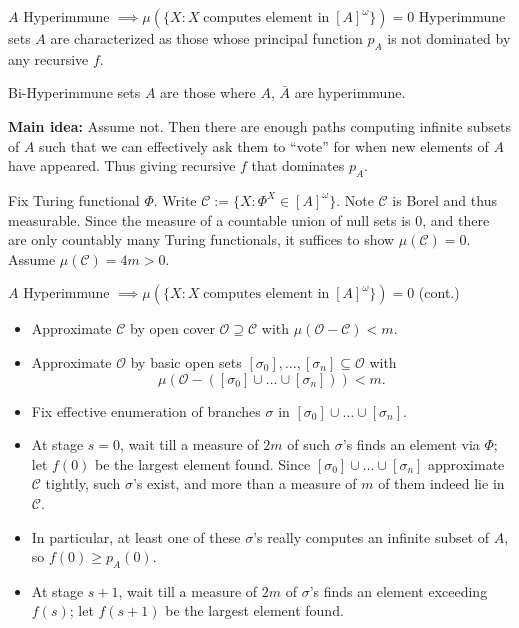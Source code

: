 \begin{frame}{$A$ Hyperimmune $\implies \mu(\{X: X\; \text{computes
element in}\; [A]^\omega\}) =0$}
  Hyperimmune sets $A$ are characterized as those whose principal
  function $p_A$ is not dominated by any recursive $f$. \\
  \vspace{1em}

  Bi-Hyperimmune sets $A$ are those where $A$, $\bar{A}$ are hyperimmune.\\
  \vspace{1em}

  \textbf{Main idea:} Assume not. Then there are enough paths computing
  infinite subsets of $A$ such that we can effectively ask them to ``vote''
  for when new elements of $A$ have appeared. Thus giving recursive
  $f$ that dominates $p_A$.\\
  \vspace{1em}

  Fix Turing functional $\Phi$. Write $\mathcal{C} :=\{X:
  \Phi^X\in[A]^\omega\}$. Note $\mathcal{C}$ is Borel and thus measurable.
  Since the measure of a countable union of null sets is 0, and
  there are only countably many Turing functionals, it suffices to show
  $\mu(\mathcal{C})=0$. Assume $\mu(\mathcal{C})=4m>0$.
\end{frame}

\begin{frame}{$A$ Hyperimmune $\implies \mu(\{X: X\; \text{computes
element in}\; [A]^\omega\}) =0$ (cont.)}
  \begin{itemize}
    \item Approximate $\mathcal{C}$ by open cover
      $\mathcal{O}\supseteq\mathcal{C}$ with
      $\mu(\mathcal{O}-\mathcal{C})<m$.
    \item Approximate $\mathcal{O}$ by basic open sets
      $[\sigma_0],\ldots,[\sigma_n] \subseteq\mathcal{O}$ with
      \[\mu(\mathcal{O}-([\sigma_0]\cup\ldots\cup[\sigma_n])) <m.\]
    \item Fix effective enumeration of branches $\sigma$ in
      $[\sigma_0]\cup\ldots\cup[\sigma_n]$.
    \item At stage $s=0$, wait till a measure of $2m$ of such $\sigma$'s
      finds an element via $\Phi$; let $f(0)$ be the largest element found.
      Since $[\sigma_0]\cup\ldots\cup[\sigma_n]$ approximate $\mathcal{C}$
      tightly, such $\sigma$'s exist, and more than a measure of $m$ of
      them indeed lie in $\mathcal{C}$.
    \item In particular, at least one of these $\sigma$'s really computes
      an infinite subset of $A$, so $f(0)\geq p_A(0)$.
    \item At stage $s+1$, wait till a measure of $2m$ of $\sigma$'s
      finds an element exceeding $f(s)$; let $f(s+1)$ be the largest
      element found.
  \end{itemize}
\end{frame}

